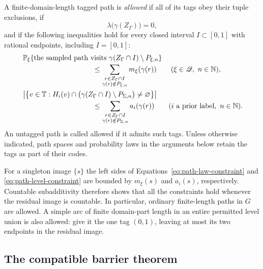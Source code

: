 \begin{definition}\label{def:path-system}
A finite-domain-length tagged path is \emph{allowed} if all of its tags
obey their tuple exclusions, if
\begin{equation}\label{eq:path-atomless-constraint}
 \lambda\bigl(\gamma(Z_\Gamma)\bigr)=0,
\end{equation}
and if the following inequalities hold for every closed interval
$I\subset[0,1]$ with rational endpoints, including $I=[0,1]$:
\begin{align}
 &\Prob_\xi\{\text{the sampled path visits }
           \gamma(Z_\Gamma\cap I)\setminus P_{\xi,n}\}
 \nonumber\\[-2pt]
 &\hspace{35mm}\le
   \sum_{\substack{r\in Z_\Gamma\cap I\\
                   \gamma(r)\notin P_{\xi,n}}}
              m_\xi(\gamma(r))
 \qquad(\xi\in\mathscr Q,\ n\in\N),
 \label{eq:path-law-constraint}\\
 &\left|\left\{v\in\T:
      H_i(v)\cap
       \bigl(\gamma(Z_\Gamma\cap I)\setminus P_{\Sigma,n}\bigr)
                      \ne\varnothing\right\}\right|
 \nonumber\\[-2pt]
 &\hspace{35mm}\le
   \sum_{\substack{r\in Z_\Gamma\cap I\\
                   \gamma(r)\notin P_{\Sigma,n}}}
              a_i(\gamma(r))
 \qquad(i\text{ a prior label},\ n\in\N).
 \label{eq:path-level-constraint}
\end{align}
An untagged path is called allowed if it admits such tags.  Unless
otherwise indicated, path spaces and probability laws in the arguments
below retain the tags as part of their codes.
\end{definition}

For a singleton image $\{s\}$ the left sides of
Equations~\eqref{eq:path-law-constraint} and
\eqref{eq:path-level-constraint} are bounded by $m_\xi(s)$ and $a_i(s)$,
respectively.  Countable subadditivity therefore shows that all the
constraints hold whenever the residual image is countable.  In
particular, ordinary finite-length paths in $G$ are allowed.  A simple
arc of finite domain-part length in an entire permitted level union
is also allowed: give it the one tag $(0,1)$, leaving at most its two
endpoints in the residual image.

\subsection{The compatible barrier theorem}

